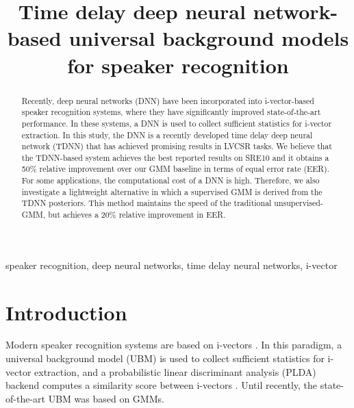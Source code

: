 \documentclass{article}
\title{Time delay deep neural network-based universal background models for speaker recognition\vspace{-2ex}}
\begin{document}
%
\maketitle
%
\begin{abstract}

Recently, deep neural networks (DNN) have been incorporated into i-vector-based speaker
recognition systems, where they have significantly improved state-of-the-art performance. In these
systems, a DNN is used to collect sufficient statistics for i-vector extraction.
In this study, the DNN is a recently developed time delay deep neural network
(TDNN) that has achieved promising results in LVCSR tasks. 
We believe that the
TDNN-based system achieves the best reported results on SRE10 and it obtains a 50\% relative 
improvement over our GMM baseline in terms of equal error rate (EER). 
For some applications, the computational cost of a DNN is high. 
Therefore, we also investigate a lightweight alternative in which a supervised GMM is derived from
the TDNN posteriors. This method maintains the speed of the traditional unsupervised-GMM,
but achieves a 20\% relative improvement in EER.
\end{abstract}
%
\begin{keywords}
speaker recognition, deep neural networks, time delay neural networks, i-vector
\end{keywords}
%
\vspace{12mm}
\section{Introduction}
\label{sec:intro}

Modern speaker recognition systems are based on i-vectors \cite{ivector}.
In this paradigm, a universal background model (UBM) is used to collect
sufficient statistics for i-vector extraction, and a probabilistic 
linear discriminant analysis (PLDA) backend computes a similarity score between i-vectors
 \cite{plda_prince, brummer2010speaker, kenny2010bayesian, villalba2011towards, garcia2011analysis, garcia2012multicondition}.
Until recently, the state-of-the-art UBM was based on GMMs.
\end{document}
